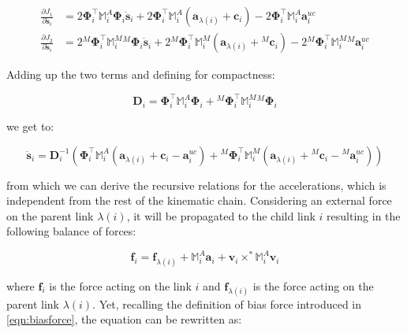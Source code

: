 \begin{align}
    \frac{\partial J _1}{\partial \ddot{\mathbf{s}} _i} & = 2 \boldsymbol{\Phi} ^\top _i \mathbb{M} ^A _i \boldsymbol{\Phi} _i \ddot{\mathbf{s}} _i + 2 \boldsymbol{\Phi} ^\top _i \mathbb{M} ^A _i (\mathbf{a} _{\lambda (i)} + \mathbf{c} _i) - 2 \boldsymbol{\Phi} ^\top _i \mathbb{M} ^A _i \mathbf{a} ^{uc} _i \nonumber                                        \\
    \frac{\partial J _2}{\partial \ddot{\mathbf{s}} _i} & = 2 {} ^M \boldsymbol{\Phi} ^\top _i \mathbb{M} ^M _i {} ^M \boldsymbol{\Phi} _i \ddot{\mathbf{s}} _i + 2 {} ^M  \boldsymbol{\Phi} ^\top _i \mathbb{M} ^M _i (\mathbf{a} _{\lambda (i)} + {} ^M  \mathbf{c} _i) - 2 {} ^M \boldsymbol{\Phi} ^\top _i \mathbb{M} ^M _i {} ^M \mathbf{a} ^{uc} _i  \nonumber
\end{align}

Adding up the two terms and defining for compactness:

\begin{equation}
    \mathbf{D} _i = \boldsymbol{\Phi} ^\top _i \mathbb{M} ^A _i \boldsymbol{\Phi} _i + {} ^M \boldsymbol{\Phi} ^\top _i \mathbb{M} ^M _i {} ^M \boldsymbol{\Phi} _i
\end{equation}

we get to:

\begin{equation}
    \label{eqn:aba_jointacc}
    \ddot{\mathbf{s}} _i = \mathbf{D} _i ^{-1} (\boldsymbol{\Phi} ^\top _i \mathbb{M} ^A _i (\mathbf{a} _{\lambda (i)} + \mathbf{c} _i - \mathbf{a} ^{uc} _i) + {} ^M \boldsymbol{\Phi} ^\top _i \mathbb{M} ^M _i ( \mathbf{a} _{\lambda (i)} + {} ^M \mathbf{c} _i - {} ^M \mathbf{a} ^{uc} _i))
\end{equation}

from which we can derive the recursive relations for the accelerations, which is independent from the rest of the kinematic chain. Considering an external force on the parent link $\lambda (i)$, it will be propagated to the child link $i$ resulting in the following balance of forces:

\begin{equation}
    \mathbf{f} _i = \mathbf{f} _{\lambda (i)} + \mathbb{M} ^A _i \mathbf{a} _i + \mathbf{v} _i \times ^* \mathbb{M} ^A _i \mathbf{v} _i
\end{equation}

where $\mathbf{f} _i$ is the force acting on the link $i$ and $\mathbf{f} _{\lambda (i)}$ is the force acting on the parent link $\lambda (i)$. Yet, recalling the definition of bias force introduced in \cref{eqn:biasforce}, the equation can be rewritten as:

